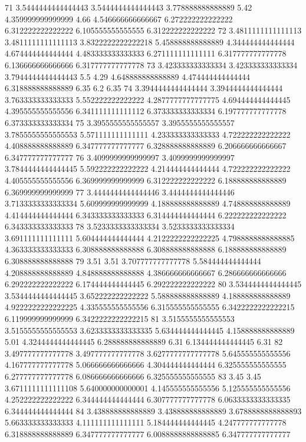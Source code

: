 71 3.5444444444444443 3.5444444444444443 3.778888888888889 5.42 4.359999999999999 4.66 4.546666666666667 6.272222222222222 6.312222222222222 6.105555555555555 6.312222222222222
72 3.4811111111111113 3.4811111111111113 3.8322222222222218 5.458888888888889 4.344444444444444 4.674444444444444 4.483333333333333 6.271111111111111 6.317777777777778 6.136666666666666 6.317777777777778
73 3.423333333333334 3.423333333333334 3.7944444444444443 5.5 4.29 4.648888888888889 4.474444444444444 6.318888888888889 6.35 6.2 6.35
74 3.3944444444444444 3.3944444444444444 3.763333333333333 5.552222222222222 4.2877777777777775 4.694444444444445 4.395555555555556 6.341111111111112 6.373333333333334 6.197777777777778 6.373333333333334
75 3.3955555555555557 3.3955555555555557 3.7855555555555553 5.571111111111111 4.233333333333333 4.722222222222222 4.408888888888889 6.347777777777777 6.328888888888889 6.206666666666667 6.347777777777777
76 3.4099999999999997 3.4099999999999997 3.7844444444444445 5.592222222222222 4.214444444444444 4.722222222222222 4.405555555555556 6.369999999999999 6.312222222222222 6.188888888888889 6.369999999999999
77 3.4444444444444446 3.4444444444444446 3.7133333333333334 5.609999999999999 4.188888888888889 4.748888888888889 4.414444444444444 6.343333333333333 6.314444444444444 6.222222222222222 6.343333333333333
78 3.5233333333333334 3.5233333333333334 3.691111111111111 5.604444444444444 4.2122222222222225 4.7988888888888885 4.363333333333333 6.308888888888888 6.308888888888888 6.188888888888889 6.308888888888888
79 3.51 3.51 3.707777777777778 5.584444444444444 4.208888888888889 4.848888888888888 4.386666666666667 6.286666666666666 6.292222222222222 6.174444444444445 6.292222222222222
80 3.5344444444444445 3.5344444444444445 3.652222222222222 5.588888888888889 4.188888888888889 4.9222222222222225 4.335555555555556 6.315555555555555 6.3422222222222215 6.119999999999999 6.3422222222222215
81 3.5155555555555553 3.5155555555555553 3.6233333333333335 5.634444444444445 4.158888888888889 5.01 4.3244444444444445 6.288888888888889 6.31 6.134444444444445 6.31
82 3.497777777777778 3.497777777777778 3.6277777777777778 5.645555555555556 4.167777777777778 5.066666666666666 4.304444444444444 6.325555555555555 6.277777777777778 6.086666666666666 6.325555555555555
83 3.45 3.45 3.6711111111111108 5.640000000000001 4.145555555555556 5.125555555555556 4.252222222222222 6.344444444444444 6.307777777777778 6.0633333333333335 6.344444444444444
84 3.438888888888889 3.438888888888889 3.6788888888888893 5.663333333333333 4.111111111111111 5.184444444444445 4.247777777777778 6.318888888888889 6.347777777777777 6.0088888888888885 6.347777777777777
